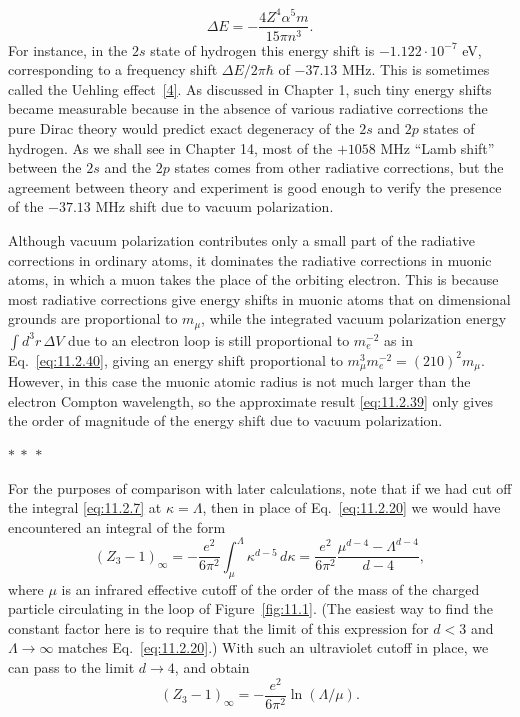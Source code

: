 \begin{equation}
  \Delta E=-\frac{4Z^4\alpha^5m}{15\pi n^3}.
  \tag{11.2.42}\label{eq:11.2.42}
\end{equation}
For instance, in the $2s$ state of hydrogen this energy shift is
$-1.122\cdot10^{-7}$ eV, corresponding to a frequency shift
$\Delta E/2\pi\hbar$ of $-37.13$ MHz. This is sometimes called the
Uehling effect~\hyperref[ref:11.4]{[4]}. As discussed in Chapter 1, such tiny energy shifts became
measurable because in the absence of various radiative corrections the pure
Dirac theory would predict exact degeneracy of the $2s$ and $2p$ states of
hydrogen. As we shall see in Chapter 14, most of the $+1058$ MHz ``Lamb
shift'' between the $2s$ and the $2p$ states comes from other radiative
corrections, but the agreement between theory and experiment is good enough
to verify the presence of the $-37.13$ MHz shift due to vacuum polarization.

Although vacuum polarization contributes only a small part of the radiative
corrections in ordinary atoms, it dominates the radiative corrections in
muonic atoms, in which a muon takes the place of the orbiting electron.
This is because most radiative corrections give energy shifts in muonic atoms
that on dimensional grounds are proportional to $m_\mu$, while the integrated
vacuum polarization energy $\int d^3r\,\Delta V$ due to an electron loop is
still proportional to $m_e^{-2}$ as in Eq.~\eqref{eq:11.2.40}, giving an energy shift
proportional to $m_\mu^3m_e^{-2}=(210)^2m_\mu$. However, in this case the
muonic atomic radius is not much larger than the electron Compton wavelength,
so the approximate result \eqref{eq:11.2.39} only gives the order of magnitude of the
energy shift due to vacuum polarization.

\begin{center}
  $*\ *\ *$
\end{center}

For the purposes of comparison with later calculations, note that if we
had cut off the integral \eqref{eq:11.2.7} at $\kappa=\Lambda$, then in place of
Eq.~\eqref{eq:11.2.20} we would have encountered an integral of the form
\[
  (Z_3-1)_\infty=-\frac{e^2}{6\pi^2}\int_\mu^\Lambda
  \kappa^{d-5}\,d\kappa
  =\frac{e^2}{6\pi^2}\frac{\mu^{d-4}-\Lambda^{d-4}}{d-4},
\]
where $\mu$ is an infrared effective cutoff of the order of the mass of the
charged particle circulating in the loop of Figure~\ref{fig:11.1}. (The easiest way to
find the constant factor here is to require that the limit of this expression
for $d<3$ and $\Lambda\to\infty$ matches Eq.~\eqref{eq:11.2.20}.) With such an
ultraviolet cutoff in place, we can pass to the limit $d\to4$, and obtain
\begin{equation}
  (Z_3-1)_\infty=-\frac{e^2}{6\pi^2}\ln(\Lambda/\mu).
  \tag{11.2.43}\label{eq:11.2.43}
\end{equation}
